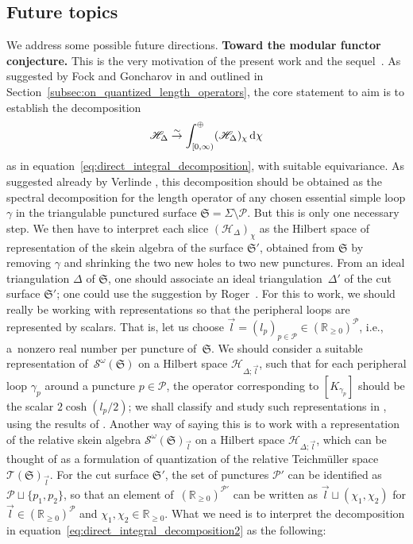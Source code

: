 \documentclass[pdftex]{sigma}
\numberwithin{equation}{section}
\theoremstyle{definition}
\begin{document}
\subsection{Future topics}\label{subsec:future_topics} We address some possible future directions.
{\bf Toward the modular functor conjecture.}
This is the very motivation of the present work and the sequel~\cite{sequel}. As suggested by Fock and Goncharov in \cite{FG09} and outlined in Section~\ref{subsec:on_quantized_length_operators}, the core statement to aim is to establish the decomposition
\begin{align}
\label{eq:direct_integral_decomposition2}
\mathscr{H}_\Delta \stackrel{\sim}{\to} \int_{[0,\infty)}^\oplus (\mathscr{H}_\Delta)_\chi \, {\rm d}\chi
\end{align}
as in equation~\eqref{eq:direct_integral_decomposition}, with suitable equivariance. As suggested already by Verlinde \cite{Verlinde}, this decomposition should be obtained as the spectral decomposition for the length operator  of any chosen essential simple loop $\gamma$ in the triangulable punctured surface $\mathfrak{S} = \Sigma\setminus \mathcal{P}$. But this is only one necessary step. We then have to interpret each slice $(\mathscr{H}_\Delta)_\chi$ as the Hilbert space of representation of the skein algebra of the surface $\mathfrak{S}'$, obtained from $\mathfrak{S}$ by removing $\gamma$ and shrinking the two new holes to two new punctures. From an ideal triangulation $\Delta$ of $\mathfrak{S}$, one should associate an ideal triangulation~$\Delta'$ of the cut surface $\mathfrak{S}'$; one could use the suggestion by Roger~\cite{Roger}. For this to work, we should really be working with representations so that the peripheral loops are represented by scalars. That is, let us choose $\vec{l} = (l_p)_{p \in \mathcal{P}} \in (\mathbb{R}_{\ge 0})^\mathcal{P}$, i.e., a~nonzero real number per puncture of~$\mathfrak{S}$. We should consider a suitable representation of~$\mathcal{S}^\omega(\mathfrak{S})$ on a Hilbert space $\mathscr{H}_{\Delta;\vec{l}}$, such that for each peripheral loop $\gamma_p$ around a puncture $p\in \mathcal{P}$, the operator corresponding to $[K_{\gamma_p}]$ should be the scalar $2\cosh(l_p/2)$; we shall classify and study such representations in \cite{sequel}, using the results of \cite{Kim_irreducible}. Another way of saying this is to work with a representation of the relative skein algebra $\mathcal{S}^\omega(\mathfrak{S})_{\vec{l}}$ on a Hilbert space $\mathscr{H}_{\Delta;\vec{l}}$, which can be thought of as a formulation of quantization of the relative Teichm\"uller space $\mathscr{T}(\mathfrak{S})_{\vec{l}}$. For the cut surface $\mathfrak{S}'$, the set of punctures $\mathcal{P}'$ can be identified as $\mathcal{P} \sqcup \{p_1,p_2\}$, so that an element of~$(\mathbb{R}_{\ge 0})^{\mathcal{P}'}$ can be written as $\vec{l} \sqcup (\chi_1,\chi_2)$ for $\vec{l} \in (\mathbb{R}_{\ge 0})^\mathcal{P}$ and $\chi_1,\chi_2 \in \mathbb{R}_{\ge 0}$. What we need is to interpret the decomposition in equation~\eqref{eq:direct_integral_decomposition2} as the following:
\end{document}
